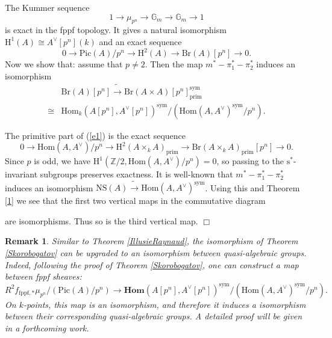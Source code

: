 \documentclass[a4paper,12pt,twoside]{report}
\newtheorem{remark}[theorem]{Remark}
\newcommand{\Z}{\mathbb{Z}}
\newcommand{\G}{\mathbb{G}}
\newcommand{\fppf}{\mathrm{fppf}}
\newcommand{\prim}{\mathrm{prim}}
\newcommand{\Pic}{\mathrm{Pic}}
\newcommand{\Br}{\mathrm{Br}}
\newcommand{\NS}{\mathrm{NS}}
\newcommand{\HH}{\mathrm{H}}
\newcommand{\Hom}{\mathrm{Hom}}
\newcommand{\sym}{\mathrm{sym}}
\begin{document}
\medskip

The Kummer sequence
$$1\to\mu_{p^n}\to\G_m\to\G_m\to 1$$
is exact in the fppf topology. It gives a natural isomorphism
$\HH^1(A)\cong A^\vee[p^n](k)$
and an exact sequence
\begin{equation}
0\to \Pic(A)/p^n\to\HH^2(A)\to\Br(A)[p^n]\to 0.\label{e1}
\end{equation}
Now we show that: assume that $p\neq 2$. Then the map $m^*-\pi_1^*-\pi_2^*$ induces an
isomorphism 
\[\begin{aligned}
    &\Br(A)[p^n]\tilde\longrightarrow\Br(A\times A)[p^n]_\prim^\sym\\
    \cong& \Hom_k(A[p^n],A^\vee[p^n])^\sym/(\Hom(A,A^\vee)^\sym/p^n).
\end{aligned}\]

    The primitive part of (\ref{e1}) is the exact sequence
$$0\to\Hom(A,A^\vee)/p^n\to\HH^2(A\times_kA)_\prim\to\Br(A\times_kA)_\prim[p^n]\to 0.$$
Since $p$ is odd, we have $\HH^1(\Z/2,\Hom(A,A^\vee)/p^n)=0$, so passing to
the $\mathrm{s}^*$-invariant subgroups preserves exactness. It is well-known
that $m^*-\pi_1^*-\pi_2^*$ induces an isomorphism $\NS(A)\tilde\longrightarrow\Hom(A,A^\vee)^\sym$.
Using this and Theorem \ref{1} we see that the first two vertical maps
in the commutative diagram
\begin{small}
\begin{center}
\end{center}
\end{small}
are isomorphisms. Thus so is the third vertical map. \hfill $\Box$

\begin{remark}
    Similar to Theorem \ref{IllusieRaynaud}, 
    the isomorphism of Theorem \ref{Skorobogatov} 
    can be upgraded to an isomorphism between quasi-algebraic groups. 
    Indeed, following the proof of Theorem \ref{Skorobogatov}, one can construct a map between fppf sheaves: 
    \[R^2f_{\fppf,*}\mu_{p^n}/(\Pic(A)/p^n)\rightarrow \mathbf{Hom}(A[p^n],A^{\vee}[p^n])^{\sym}/(\Hom(A,A^{\vee})^{\sym}/p^n).\]
    On \(k\)-points, this map is an isomorphism, 
    and therefore it induces a isomorphism between their corresponding quasi-algebraic groups. 
    A detailed proof will be given in a forthcoming work. 
\end{remark}
\end{document}
